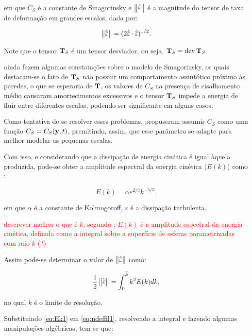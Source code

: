 \documentclass[_ArquivoPrincipal.tex]{subfiles}
\begin{document}
\noindent em que $C_S$ é a constante de Smagorinsky e $\left\lVert{\dot{\overline{\mathbf{\varepsilon}}}}\right\lVert$ é a magnitude do tensor de taxa de deformação em grandes escalas, dada por:

\begin{equation}
    \left\lVert{\dot{\overline{\mathbf{\varepsilon}}}}\right\lVert=(2\dot{\overline{\mathbf{\varepsilon}}}\cdot\dot{\overline{\mathbf{\varepsilon}}})^{1/2}\text{.}
\end{equation}

Note que o tensor $\mathbf{T}_S$ é um tensor desviador, ou seja, $\mathbf{T}_S=\mathop{\mathrm{dev}}\nolimits{\mathbf{T}_S}$.

 ainda fazem algumas constatações sobre o modelo de Smagorinsky, os quais destacam-se o fato de $\mathbf{T}_S$ não possuir um comportamento assintótico próximo às paredes, o que se esperaria de $\mathbf{T}$, os valores de $C_S$ na presença de cisalhamento médio causaram amortecimentos excessivos e o tensor $\mathbf{T}_S$ impede a energia de fluir entre diferentes escalas, podendo ser significante em alguns casos.

Como tentativa de se resolver esses problemas,  propuseram assumir $C_S$ como uma função $C_S=C_S(\mathbf{y},t)$, premitindo, assim, que esse parâmetro se adapte para melhor modelar as pequenas escalas.

Com isso, e considerando que a dissipação de energia cinática é igual àquela produzida, pode-se obter a amplitude espectral da energia cinética ($E(k)$) como \cite{hughes2000large}:

\begin{equation}
    E(k)=\alpha\varepsilon^{2/3}k^{-5/3}\text{,}\label{eq:Ek1}
\end{equation}

\noindent em que $\alpha$ é a constante de Kolmogoroff, $\varepsilon$ é a dissipação turbulenta.

\textcolor{red}{descrever melhor o que é $k$, segundo : $E(k)$ é a amplitude espectral da energia cinética, definida como a integral sobre a superfície de esferas parametrizadas com raio $k$ (?)}

Assim pode-se determinar o valor de $\left\lVert{\dot{\overline{\mathbf{\varepsilon}}}}\right\lVert$ como:

\begin{equation}
    \frac{1}{2}\left\lVert{\dot{\overline{\mathbf{\varepsilon}}}}\right\lVert=\int_0^{\overline{k}}{k^2E(k)dk}\text{,}\label{eq:ndeffil1}
\end{equation}

\noindent no qual $\bar{k}$ é o limite de resolução.

Substituindo \ref{eq:Ek1} em \ref{eq:ndeffil1}, resolvendo a integral e fazendo algumas manipulações algébricas, tem-se que:
\end{document}
